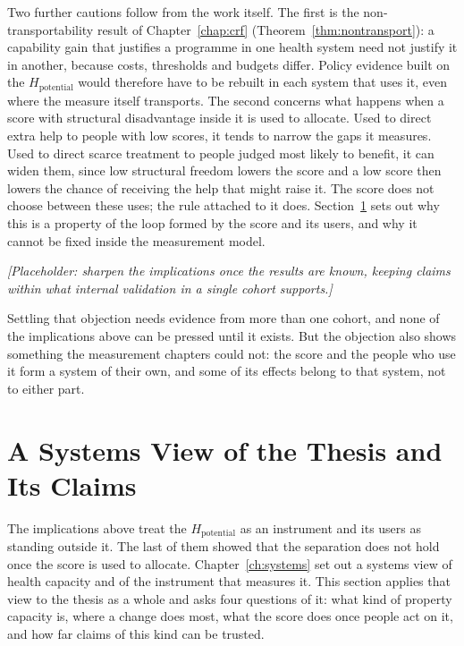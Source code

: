 Two further cautions follow from the work itself. The first is the
non-transportability result of Chapter~\ref{chap:crf}
(Theorem~\ref{thm:nontransport}): a capability gain that justifies a programme in
one health system need not justify it in another, because costs, thresholds and
budgets differ. Policy evidence built on the $H_{\text{potential}}$ would therefore
have to be rebuilt in each system that uses it, even where the measure itself
transports. The second concerns what happens when a score with structural
disadvantage inside it is used to allocate. Used to direct extra help to people
with low scores, it tends to narrow the gaps it measures. Used to direct scarce
treatment to people judged most likely to benefit, it can widen them, since low
structural freedom lowers the score and a low score then lowers the chance of
receiving the help that might raise it. The score does not choose between these
uses; the rule attached to it does. Section~\ref{sec:disc-systems} sets out why
this is a property of the loop formed by the score and its users, and why it
cannot be fixed inside the measurement model.

\medskip
\noindent\emph{[Placeholder: sharpen the implications once the results are known, keeping claims within what internal validation in a single cohort supports.]}

Settling that objection needs evidence from more than one cohort, and none of the
implications above can be pressed until it exists. But the objection also shows
something the measurement chapters could not: the score and the people who use it
form a system of their own, and some of its effects belong to that system, not to
either part.

\section{A Systems View of the Thesis and Its Claims}
\label{sec:disc-systems}

\noindent The implications above treat the $H_{\text{potential}}$ as an instrument
and its users as standing outside it. The last of them showed that the separation
does not hold once the score is used to allocate. Chapter~\ref{ch:systems} set out a
systems view of health capacity and of the instrument that measures it. This
section applies that view to the thesis as a whole and asks four questions of it:
what kind of property capacity is, where a change does most, what the score does
once people act on it, and how far claims of this kind can be trusted.


